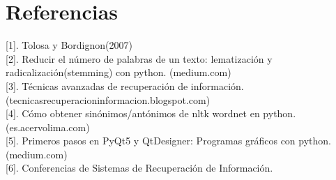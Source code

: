 \documentclass{llncs}
\begin{document}
%
\section{Referencias}
%


[1]. Tolosa y Bordignon(2007)\\

[2]. Reducir el n\'umero de palabras de un texto: lematizaci\'on y radicalizaci\'on(stemming) con python. (medium.com)\\

[3]. T\'ecnicas avanzadas de recuperaci\'on de informaci\'on.(tecnicasrecuperacioninformacion.blogspot.com)\\

[4]. C\'omo obtener sin\'onimos/ant\'onimos de nltk wordnet en python. (es.acervolima.com)\\

[5]. Primeros pasos en PyQt5 y QtDesigner: Programas gr\'aficos con python. (medium.com)\\

[6]. Conferencias de Sistemas de Recuperaci\'on de Informaci\'on.\\
\end{document}
